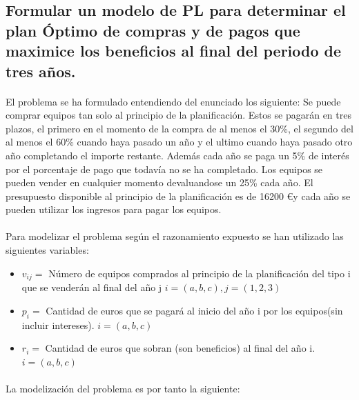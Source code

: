 \documentclass[10pt, a4paper]{article}
\begin{document}
		\subsection{Formular un modelo de PL para determinar el plan Óptimo de compras y de pagos que maximice los beneficios al final del periodo de tres años.}

			\paragraph{}
			El problema se ha formulado entendiendo del enunciado los siguiente: Se puede comprar equipos tan solo al principio de la planificación. Estos se pagarán en tres plazos, el primero en el momento de la compra de al menos el 30\%, el segundo del al menos el 60\% cuando haya pasado un año y el ultimo cuando haya pasado otro año completando el importe restante. Además cada año se paga un 5\% de interés por el porcentaje de pago que todavía no se ha completado. Los equipos se pueden vender en cualquier momento devaluandose un 25\% cada año. El presupuesto disponible al principio de la planificación es de 16200 \euro y cada año se pueden utilizar los ingresos para pagar los equipos.

			\paragraph{}
			Para modelizar el problema según el razonamiento expuesto se han utilizado las siguientes variables:

			\begin{itemize}
				\item \(v_{ij} = \) Número de equipos comprados al principio de la planificación del tipo i que se venderán al final del año j \(i = (a,b,c), j=(1,2,3)\)
				\item \(p_{i} = \) Cantidad de euros que se pagará al inicio del año i por los equipos(sin incluir intereses). \(i = (a,b,c)\)
				\item \(r_{i} = \) Cantidad de euros que sobran (son beneficios) al final del año i. \(i = (a,b,c)\)
			\end{itemize}

			\paragraph{}
			La modelización del problema es por tanto la siguiente:
\end{document}
